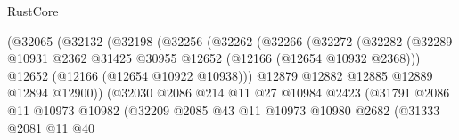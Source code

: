 \begin{lexlean}{RustCore}
\begin{coremodule}
                                    (@32065
                                      (@32132
                                        (@32198
                                          (@32256
                                            (@32262
                                              (@32266
                                                (@32272
                                                  (@32282
                                                    (@32289
                                                      @10931
                                                      @2362
                                                      @31425
                                                      @30955
                                                      @12652
                                                      (@12166 (@12654 @10932 @2368)))
                                                    @12652
                                                    (@12166 (@12654 @10922 @10938)))
                                                  @12879
                                                  @12882
                                                  @12885
                                                  @12889
                                                  @12894
                                                  @12900))
                                              (@32030
                                                @2086
                                                @214
                                                @11
                                                @27
                                                @10984
                                                @2423
                                                (@31791
                                                  @2086
                                                  @11
                                                  @10973
                                                  @10982
                                                  (@32209
                                                    @2085
                                                    @43
                                                    @11
                                                    @10973
                                                    @10980
                                                    @2682
                                                    (@31333
                                                      @2081
                                                      @11
                                                      @40

\end{coremodule}
\end{lexlean}
